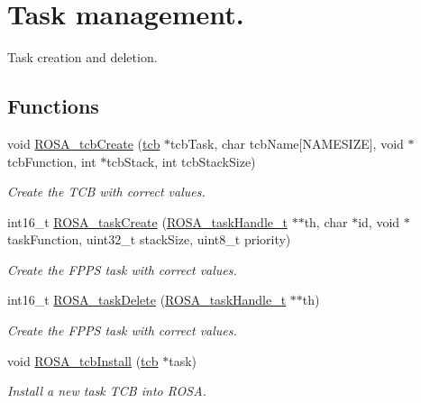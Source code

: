 \hypertarget{group__rosa__kernel__tm}{}\section{Task management.}
\label{group__rosa__kernel__tm}


Task creation and deletion.  


\subsection*{Functions}
\begin{DoxyCompactItemize}
\item 
void \mbox{\hyperlink{group__rosa__kernel__tm_ga88a553c195e2f549835cbbf4e36a71ff}{R\+O\+S\+A\+\_\+tcb\+Create}} (\mbox{\hyperlink{structtcb__record__t}{tcb}} $\ast$tcb\+Task, char tcb\+Name\mbox{[}N\+A\+M\+E\+S\+I\+ZE\mbox{]}, void $\ast$tcb\+Function, int $\ast$tcb\+Stack, int tcb\+Stack\+Size)
\begin{DoxyCompactList}\small\item\em Create the T\+CB with correct values. \end{DoxyCompactList}\item 
int16\+\_\+t \mbox{\hyperlink{group__rosa__kernel__tm_ga7b9542dcdbdadbfc94f42f85536a83b0}{R\+O\+S\+A\+\_\+task\+Create}} (\mbox{\hyperlink{structtcb__record__t}{R\+O\+S\+A\+\_\+task\+Handle\+\_\+t}} $\ast$$\ast$th, char $\ast$id, void $\ast$task\+Function, uint32\+\_\+t stack\+Size, uint8\+\_\+t priority)
\begin{DoxyCompactList}\small\item\em Create the F\+P\+PS task with correct values. \end{DoxyCompactList}\item 
int16\+\_\+t \mbox{\hyperlink{group__rosa__kernel__tm_gad0845723ed20c9e51a81a7b388dbc555}{R\+O\+S\+A\+\_\+task\+Delete}} (\mbox{\hyperlink{structtcb__record__t}{R\+O\+S\+A\+\_\+task\+Handle\+\_\+t}} $\ast$$\ast$th)
\begin{DoxyCompactList}\small\item\em Create the F\+P\+PS task with correct values. \end{DoxyCompactList}\item 
void \mbox{\hyperlink{group__rosa__kernel__tm_ga9a7bde19bc8609de66353d1f51d09eda}{R\+O\+S\+A\+\_\+tcb\+Install}} (\mbox{\hyperlink{structtcb__record__t}{tcb}} $\ast$task)
\begin{DoxyCompactList}\small\item\em Install a new task T\+CB into R\+O\+SA. \end{DoxyCompactList}\end{DoxyCompactItemize}



